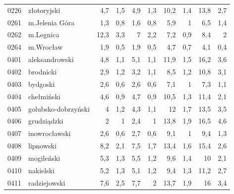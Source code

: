\begin{center}
\begin{longtable}{lp{3cm}rrrrrrrr}
0226 & złotoryjski             & 4,7     & 1,5         & 4,9      & 1,3          & 10,2     & 1,4          & 13,8     & 2,7          \\
0261 & m.Jelenia Góra          & 1,3     & 0,8         & 1,6      & 0,8          & 5,9      & 1            & 6,5      & 1,4          \\
0262 & m.Legnica               & 12,3    & 3,3         & 7        & 2,2          & 7,2      & 0,9          & 8,4      & 2            \\
0264 & m.Wrocław               & 1,9     & 0,5         & 1,9      & 0,5          & 4,7      & 0,7          & 4,1      & 0,4          \\
0401 & aleksandrowski          & 4,8     & 1,1         & 5,1      & 1,1          & 11,9     & 1,5          & 16,2     & 3,6          \\
0402 & brodnicki               & 2,9     & 1,2         & 3,2      & 1,1          & 8,5      & 1,2          & 10,8     & 3,1          \\
0403 & bydgoski                & 2,6     & 0,6         & 2,6      & 0,6          & 7,1      & 1            & 7,3      & 1,1          \\
0404 & chełmiński              & 4,6     & 0,9         & 4,7      & 0,9          & 10,5     & 1,3          & 11,4     & 2,1          \\
0405 & golubsko-dobrzyński     & 4       & 1,2         & 4,3      & 1,1          & 12       & 1,7          & 13,5     & 3,5          \\
0406 & grudziądzki             & 2       & 1           & 2,4      & 1            & 13,8     & 1,9          & 16,5     & 4,6          \\
0407 & inowrocławski           & 2,6     & 0,6         & 2,7      & 0,6          & 9,1      & 1            & 9,4      & 1,3          \\
0408 & lipnowski               & 8,2     & 2,1         & 7,5      & 1,7          & 13,4     & 1,6          & 15,4     & 2,6          \\
0409 & mogileński              & 5,3     & 1,3         & 5,5      & 1,2          & 9,6      & 1,4          & 10       & 2,1          \\
0410 & nakielski               & 5,2     & 1,3         & 5,1      & 1,2          & 9,4      & 1,3          & 11,2     & 2,7          \\
0411 & radziejowski            & 7,6     & 2,5         & 7,7      & 2            & 13,7     & 1,9          & 16       & 3,4          \\

\end{longtable}
\end{center}
